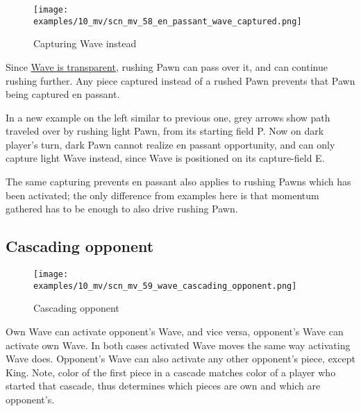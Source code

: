 
\vspace*{1.7\baselineskip}
\noindent
\begin{wrapfigure}[13]{l}{0.4\textwidth}
\centering
\texttt{[image: examples/10\_mv/scn\_mv\_58\_en\_passant\_wave\_captured.png]}
\vspace*{-1.4\baselineskip}
\caption{Capturing Wave instead}
\label{fig:scn_mv_58_en_passant_wave_captured}
\end{wrapfigure}
Since \hyperref[fig:scn_mv_07_wave_is_transparent]{Wave is transparent}, rushing
Pawn can pass over it, and can continue rushing further. Any piece captured instead
of a rushed Pawn prevents that Pawn being captured en passant.

In a new example on the left similar to previous one, grey arrows show path traveled
over by rushing light Pawn, from its starting field P. Now on dark player's turn,
dark Pawn cannot realize en passant opportunity, and can only capture light Wave
instead, since Wave is positioned on its capture-field E.

The same capturing prevents en passant also applies to rushing Pawns which has
been activated; the only difference from examples here is that momentum gathered
has to be enough to also drive rushing Pawn.

\clearpage %

\subsection*{Cascading opponent}
\label{sec:Miranda's veil/Wave/Cascading opponent}

\vspace*{-1.4\baselineskip}
\noindent
\begin{figure}[h]
\texttt{[image: examples/10\_mv/scn\_mv\_59\_wave\_cascading\_opponent.png]}
\caption{Cascading opponent}
\label{fig:scn_mv_59_wave_cascading_opponent}
\end{figure}

Own Wave can activate opponent's Wave, and vice versa, opponent's Wave can activate
own Wave. In both cases activated Wave moves the same way activating Wave does.
Opponent's Wave can also activate any other opponent's piece, except King. Note,
color of the first piece in a cascade matches color of a player who started that
cascade, thus determines which pieces are own and which are opponent's.

